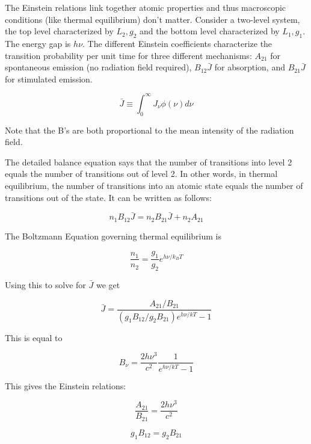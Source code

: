 \documentclass[12pt, letterpaper, preprint]{aastex}
\begin{document}
\begin{enumerate}
The Einstein relations link together atomic properties and
thus macroscopic conditions (like thermal equilibrium) don't matter.
Consider a two-level system, the top level characterized by
$L_2, g_2$ and the bottom level characterized by $L_1, g_1$. 
The energy gap is $h\nu$. The different Einstein coefficients
characterize the transition probability per unit time for
three different mechanisms: $A_{21}$ for spontaneous emission
(no radiation field required), $B_{12} \bar{J}$ for absorption,
and $B_{21} \bar{J}$ for stimulated emission.

\begin{equation}
  \bar{J} \equiv \int_0^\infty J_\nu \phi(\nu) d\nu
  \label{jbar}
\end{equation}

Note that the B's are both proportional to the mean intensity
of the radiation field.

The detailed balance equation says that the number of transitions into level 2
equals the number of transitions out of level 2. In other words,
in thermal equilibrium, the number of transitions into an atomic state
equals the number of transitions out of the state. 
It can be written as follows:

\begin{equation}
  n_1 B_{12} \bar{J} = n_2 B_{21} \bar{J} + n_2 A_{21}
  \label{detailed-balance}
\end{equation}

The Boltzmann Equation governing thermal equilibrium is

\begin{equation}
  \frac{n_1}{n_2} = \frac{g_1}{g_2} e^{h \nu / k_B T}
  \label{boltzmann-eq}
\end{equation}

Using this to solve for $\bar{J}$ we get

$$ \bar{J} = \frac{A_{21} / B_{21}}{(g_1 B_{12}/g_2 B_{21}) e^{h\nu/kT} - 1} $$

This is equal to 

$$ B_\nu = \frac{2 h \nu^3}{c^2} \frac{1}{e^{h\nu/kT}-1} $$

This gives the Einstein relations:

\begin{equation}
  \frac{A_{21}}{B_{21}} = \frac{2 h \nu^3}{c^2}
  \label{einstein-A}
\end{equation}

\begin{equation}
  g_1 B_{12} = g_2 B_{21}
  \label{einstein-B}
\end{equation}


\end{enumerate}
\end{document}
